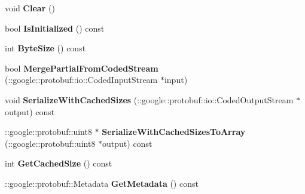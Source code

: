\begin{DoxyCompactItemize}
\item 
\hypertarget{classSimpleChat_1_1UserJoinResponse_a578bc5bc15322ac410d9f8a0054009d3}{void {\bfseries Clear} ()}\label{classSimpleChat_1_1UserJoinResponse_a578bc5bc15322ac410d9f8a0054009d3}

\item 
\hypertarget{classSimpleChat_1_1UserJoinResponse_ac69e0bc7f005430285db03b4e1d94929}{bool {\bfseries Is\-Initialized} () const }\label{classSimpleChat_1_1UserJoinResponse_ac69e0bc7f005430285db03b4e1d94929}

\item 
\hypertarget{classSimpleChat_1_1UserJoinResponse_a7bc9bfc4416d0518e5f56ab724aa8402}{int {\bfseries Byte\-Size} () const }\label{classSimpleChat_1_1UserJoinResponse_a7bc9bfc4416d0518e5f56ab724aa8402}

\item 
\hypertarget{classSimpleChat_1_1UserJoinResponse_a7dcbfc3c35fb11afabea982e9e0ff766}{bool {\bfseries Merge\-Partial\-From\-Coded\-Stream} (\-::google\-::protobuf\-::io\-::\-Coded\-Input\-Stream $\ast$input)}\label{classSimpleChat_1_1UserJoinResponse_a7dcbfc3c35fb11afabea982e9e0ff766}

\item 
\hypertarget{classSimpleChat_1_1UserJoinResponse_a6efd7ade0c5cda0fd19d22333d613e66}{void {\bfseries Serialize\-With\-Cached\-Sizes} (\-::google\-::protobuf\-::io\-::\-Coded\-Output\-Stream $\ast$output) const }\label{classSimpleChat_1_1UserJoinResponse_a6efd7ade0c5cda0fd19d22333d613e66}

\item 
\hypertarget{classSimpleChat_1_1UserJoinResponse_a997ba4d2a92b010fd02f3cef8ca99f1d}{\-::google\-::protobuf\-::uint8 $\ast$ {\bfseries Serialize\-With\-Cached\-Sizes\-To\-Array} (\-::google\-::protobuf\-::uint8 $\ast$output) const }\label{classSimpleChat_1_1UserJoinResponse_a997ba4d2a92b010fd02f3cef8ca99f1d}

\item 
\hypertarget{classSimpleChat_1_1UserJoinResponse_a4c34493152ee3e2bd48ab9f778cd39e2}{int {\bfseries Get\-Cached\-Size} () const }\label{classSimpleChat_1_1UserJoinResponse_a4c34493152ee3e2bd48ab9f778cd39e2}

\item 
\hypertarget{classSimpleChat_1_1UserJoinResponse_a7cb0a528f8cade7293c587972d9e654d}{\-::google\-::protobuf\-::\-Metadata {\bfseries Get\-Metadata} () const }\label{classSimpleChat_1_1UserJoinResponse_a7cb0a528f8cade7293c587972d9e654d}


\end{DoxyCompactItemize}
